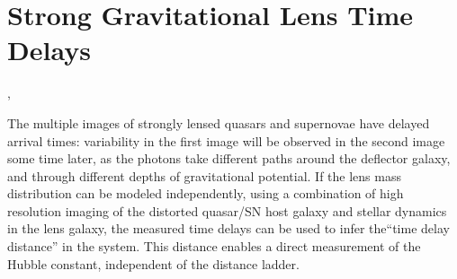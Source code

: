 %
%
%
%
%
%
%
\clearpage
\section{ Strong Gravitational Lens Time Delays }
\def\secname{lenstimedelays}\label{sec:\secname}

,



The multiple images of strongly lensed quasars and supernovae have
delayed arrival times: variability in the first image will be observed
in the second image some time later, as the photons take different
paths around the deflector galaxy, and through different depths of
gravitational potential. If the lens mass distribution can be modeled
independently, using a combination of high resolution imaging of the
distorted quasar/SN host galaxy and stellar dynamics in the lens
galaxy, the measured time delays can be used to infer the``time delay
distance'' in the system. This distance enables a direct measurement
of the Hubble constant, independent of the distance ladder.

